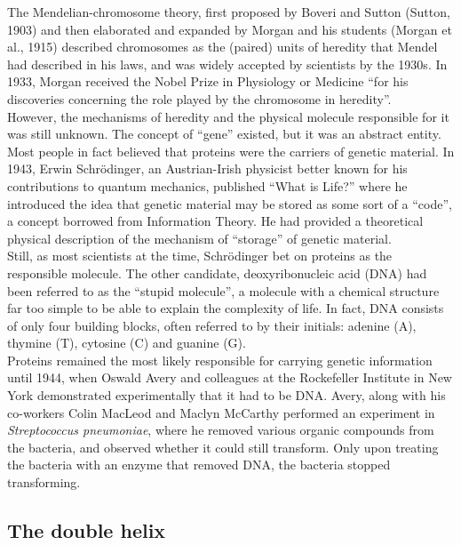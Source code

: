The Mendelian-chromosome theory, first proposed by Boveri and Sutton (Sutton, 1903) and then elaborated and expanded by Morgan and his students (Morgan et al., 1915) described chromosomes as the (paired) units of heredity that Mendel had described in his laws, and was widely accepted by scientists by the 1930s. 
In 1933, Morgan received the Nobel Prize in Physiology or Medicine “for his discoveries concerning the role played by the chromosome in heredity”.\\

However, the mechanisms of heredity and the physical molecule responsible for it was still unknown. 
The concept of “gene” existed, but it was an abstract entity. 
Most people in fact believed that proteins were the carriers of genetic material. 
In 1943, Erwin  Schrödinger, an Austrian-Irish physicist better known for his contributions to quantum mechanics, published “What is Life?” where he introduced the idea that genetic material may be stored as some sort of a “code”, a concept borrowed from Information Theory. 
He had provided a theoretical physical description of the mechanism of “storage” of genetic material.\\ 

Still, as most scientists at the time, Schrödinger bet on proteins as the responsible molecule. 
The other candidate, deoxyribonucleic acid (DNA) had been referred to as the “stupid molecule”, a molecule with a chemical structure far too simple to be able to explain the complexity of life. 
In fact, DNA consists of only four building blocks, often referred to by their initials: adenine (A), thymine (T), cytosine (C) and guanine (G).\\

Proteins remained the most likely responsible for carrying genetic information until 1944, when Oswald Avery and colleagues at the Rockefeller Institute in New York demonstrated experimentally that it had to be DNA. 
Avery, along with his co-workers Colin MacLeod and Maclyn McCarthy performed an experiment in \textit{Streptococcus pneumoniae}, where he removed various organic compounds from the bacteria, and observed whether it could still transform. 
Only upon treating the bacteria with an enzyme that removed DNA, the bacteria stopped transforming.

\subsection{The double helix} %


